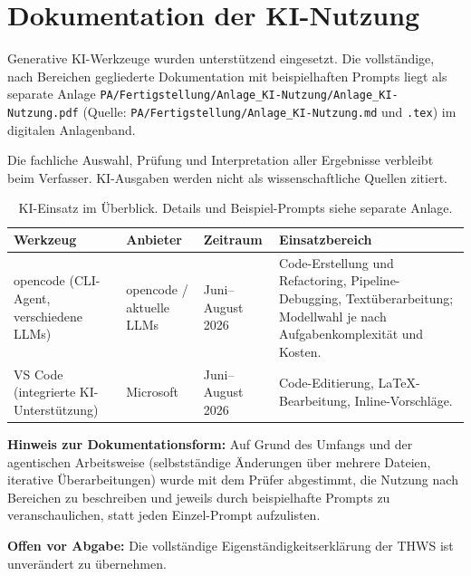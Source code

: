 \section{Dokumentation der KI-Nutzung}

Generative KI-Werkzeuge wurden unterstützend eingesetzt. Die vollständige,
nach Bereichen gegliederte Dokumentation mit beispielhaften Prompts liegt als
separate Anlage \texttt{PA/Fertigstellung/Anlage\_KI-Nutzung/Anlage\_KI-Nutzung.pdf}
(Quelle: \texttt{PA/Fertigstellung/Anlage\_KI-Nutzung.md} und \texttt{.tex})
im digitalen Anlagenband.

Die fachliche Auswahl, Prüfung und Interpretation aller Ergebnisse verbleibt
beim Verfasser. KI-Ausgaben werden nicht als wissenschaftliche Quellen
zitiert.

\begin{table}[H]
\centering
\small
\begin{tabularx}{\textwidth}{p{3.0cm}p{3.2cm}p{2.5cm}X}
\toprule
Werkzeug & Anbieter & Zeitraum & Einsatzbereich\\
\midrule
opencode (CLI-Agent, verschiedene LLMs) & opencode / aktuelle LLMs & Juni--August 2026 &
Code-Erstellung und Refactoring, Pipeline-Debugging, Textüberarbeitung; Modellwahl je nach Aufgabenkomplexität und Kosten.\\
VS Code (integrierte KI-Unterstützung) & Microsoft & Juni--August 2026 &
Code-Editierung, LaTeX-Bearbeitung, Inline-Vorschläge.\\
\bottomrule
\end{tabularx}
\caption{KI-Einsatz im Überblick. Details und Beispiel-Prompts siehe separate Anlage.}
\end{table}

\textbf{Hinweis zur Dokumentationsform:} Auf Grund des Umfangs und der
agentischen Arbeitsweise (selbstständige Änderungen über mehrere Dateien,
iterative Überarbeitungen) wurde mit dem Prüfer abgestimmt, die Nutzung nach
Bereichen zu beschreiben und jeweils durch beispielhafte Prompts zu
veranschaulichen, statt jeden Einzel-Prompt aufzulisten.

\textbf{Offen vor Abgabe:} Die vollständige Eigenständigkeitserklärung der
THWS ist unverändert zu übernehmen.
